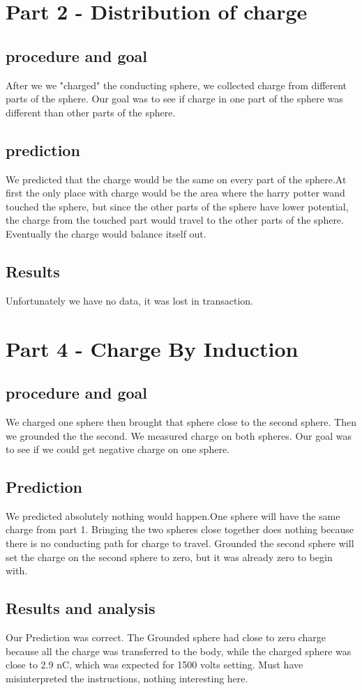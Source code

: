 \documentclass[12pt]{article}
\begin{document}
\section*{Part 2 - Distribution of charge}
\subsection*{procedure and goal}
After we we "charged" the conducting sphere, we collected charge from different parts of the sphere. Our goal was to see if charge in one part of the sphere was different than other parts of the sphere.
\subsection*{prediction}
We predicted that the charge would be the same on every part of the sphere.At first the only place with charge would be the area where the harry potter wand touched the sphere, but since the other parts of the sphere have lower potential, the charge from the touched part would travel to the other parts of the sphere. Eventually the charge would balance itself out. 
\subsection*{Results} 
Unfortunately we have no data, it was lost in transaction.   

\section*{Part 4 - Charge By Induction}
\subsection*{procedure and goal}
We charged one sphere then brought that sphere close to the second sphere. Then we grounded the the second. We measured charge on both spheres. Our goal was to see if we could get negative charge on one sphere.

\subsection*{Prediction}
We predicted absolutely nothing would happen.One sphere will have the same charge from part 1. Bringing the two spheres close together does nothing because there is no conducting path for charge to travel. Grounded the second sphere will set the charge on the second sphere to zero, but it was already zero to begin with. 

\subsection*{Results and analysis}
Our Prediction was correct. The Grounded sphere had close to zero charge because all the charge was transferred to the body, while the charged sphere was close to 2.9 nC, which was expected for 1500 volts setting. Must have misinterpreted the instructions, nothing interesting here.
\end{document}
